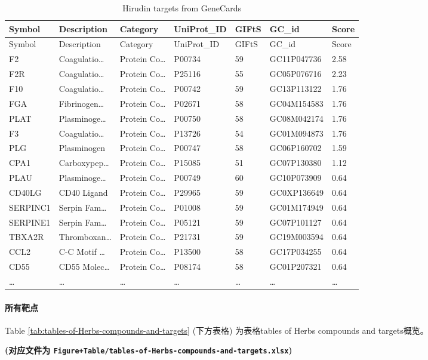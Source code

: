 \documentclass[
]{article}
\begin{document}
\begin{longtable}[]{@{}lllllll@{}}
\caption{\label{tab:Hirudin-targets-from-GeneCards}Hirudin targets from GeneCards}\tabularnewline
\toprule
Symbol & Description & Category & UniProt\_ID & GIFtS & GC\_id & Score\tabularnewline
\midrule
\endfirsthead
\toprule
Symbol & Description & Category & UniProt\_ID & GIFtS & GC\_id & Score\tabularnewline
\midrule
\endhead
F2 & Coagulatio\ldots{} & Protein Co\ldots{} & P00734 & 59 & GC11P047736 & 2.58\tabularnewline
F2R & Coagulatio\ldots{} & Protein Co\ldots{} & P25116 & 55 & GC05P076716 & 2.23\tabularnewline
F10 & Coagulatio\ldots{} & Protein Co\ldots{} & P00742 & 59 & GC13P113122 & 1.76\tabularnewline
FGA & Fibrinogen\ldots{} & Protein Co\ldots{} & P02671 & 58 & GC04M154583 & 1.76\tabularnewline
PLAT & Plasminoge\ldots{} & Protein Co\ldots{} & P00750 & 58 & GC08M042174 & 1.76\tabularnewline
F3 & Coagulatio\ldots{} & Protein Co\ldots{} & P13726 & 54 & GC01M094873 & 1.76\tabularnewline
PLG & Plasminogen & Protein Co\ldots{} & P00747 & 58 & GC06P160702 & 1.59\tabularnewline
CPA1 & Carboxypep\ldots{} & Protein Co\ldots{} & P15085 & 51 & GC07P130380 & 1.12\tabularnewline
PLAU & Plasminoge\ldots{} & Protein Co\ldots{} & P00749 & 60 & GC10P073909 & 0.64\tabularnewline
CD40LG & CD40 Ligand & Protein Co\ldots{} & P29965 & 59 & GC0XP136649 & 0.64\tabularnewline
SERPINC1 & Serpin Fam\ldots{} & Protein Co\ldots{} & P01008 & 59 & GC01M174949 & 0.64\tabularnewline
SERPINE1 & Serpin Fam\ldots{} & Protein Co\ldots{} & P05121 & 59 & GC07P101127 & 0.64\tabularnewline
TBXA2R & Thromboxan\ldots{} & Protein Co\ldots{} & P21731 & 59 & GC19M003594 & 0.64\tabularnewline
CCL2 & C-C Motif \ldots{} & Protein Co\ldots{} & P13500 & 58 & GC17P034255 & 0.64\tabularnewline
CD55 & CD55 Molec\ldots{} & Protein Co\ldots{} & P08174 & 58 & GC01P207321 & 0.64\tabularnewline
\ldots{} & \ldots{} & \ldots{} & \ldots{} & \ldots{} & \ldots{} & \ldots{}\tabularnewline
\bottomrule
\end{longtable}

\hypertarget{ux6240ux6709ux9776ux70b9}{%
\paragraph{所有靶点}\label{ux6240ux6709ux9776ux70b9}}

Table \ref{tab:tables-of-Herbs-compounds-and-targets} (下方表格) 为表格tables of Herbs compounds and targets概览。

\textbf{(对应文件为 \texttt{Figure+Table/tables-of-Herbs-compounds-and-targets.xlsx})}
\end{document}
